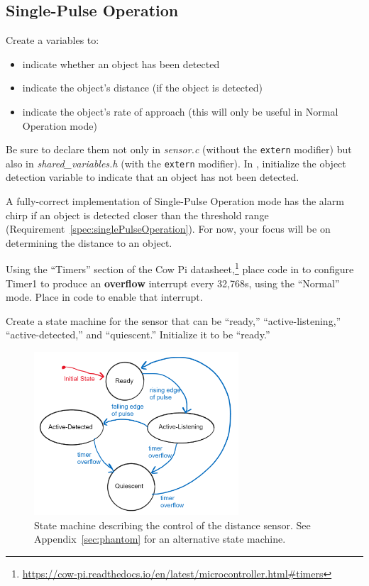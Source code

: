 \subsection{Single-Pulse Operation} \label{subsec:distanceSinglePulseOperation}

Create a variables to:
\begin{itemize}
    \item indicate whether an object has been detected
    \item indicate the object's distance (if the object is detected)
    \item indicate the object's rate of approach (this will only be useful in Normal Operation mode)
\end{itemize}
Be sure to declare them not only in \textit{sensor.c} (without the \lstinline{extern} modifier) but also in \textit{shared\_variables.h} (with the \lstinline{extern} modifier).
In , initialize the object detection variable to indicate that an object has not been detected.

A fully-correct implementation of Single-Pulse Operation mode has the alarm chirp if an object is detected closer than the threshold range (Requirement~\ref{spec:singlePulseOperation}).
For now, your focus will be on determining the distance to an object.

Using the ``Timers'' section of the Cow Pi datasheet,\footnote{
    \url{https://cow-pi.readthedocs.io/en/latest/microcontroller.html\#timers}
}
place code in  to configure Timer1 to produce an \textbf{overflow} interrupt every 32,768\textmu s, using the ``Normal'' mode.
Place in  code to enable that interrupt.

Create a state machine for the sensor that can be ``ready,'' ``active-listening,'' ``active-detected,'' and ``quiescent.''
Initialize it to be ``ready.''

\begin{figure}[h]
    \centering
    \includegraphics[width=3in]{sensorStateMachine}
    \caption{\label{fig:sensorStateMachine} State machine describing the control of the distance sensor.
        See Appendix~\ref{sec:phantom} for an alternative state machine.}
\end{figure}

